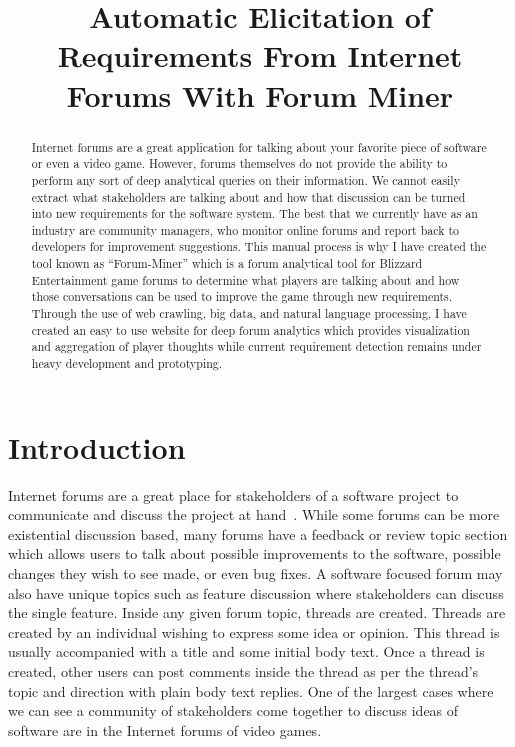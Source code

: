 \documentclass[conference]{IEEEtran}
\begin{document}
\title{Automatic Elicitation of Requirements From Internet Forums With Forum Miner}

\author{
}

\maketitle


\begin{abstract}
Internet forums are a great application for talking about your favorite piece of software
or even a video game. However, forums themselves do not provide the ability to perform any sort
of deep analytical queries on their information. We cannot easily extract what stakeholders
are talking about and how that discussion can be turned into new requirements for the software
system. The best that we currently have as an industry
are community managers, who monitor online forums and report back to developers for improvement
suggestions. This manual process is why I have created the tool known as ``Forum-Miner'' which
is a forum analytical tool for Blizzard Entertainment game forums to determine what players are talking about
and how those conversations can be used to improve the game through new requirements. Through the use of web crawling,
big data, and natural language processing, I have created an easy to use website for deep forum analytics 
which provides visualization and aggregation of player thoughts while current requirement detection
remains under heavy development and prototyping.
\end{abstract}


\section{Introduction}
Internet forums are a great place for stakeholders of a software project to communicate and discuss the
project at hand~\cite{Elsas:2010:STF}. While some forums can be more existential discussion based, many forums have a feedback
or review topic section which allows users to talk about possible improvements to the software, possible
changes they wish to see made, or even bug fixes. A software focused forum may also have unique topics
such as feature discussion where stakeholders can discuss the single feature.
Inside any given forum topic, threads are created. Threads are created by an individual wishing to express
some idea or opinion. This thread is usually accompanied with a title and some initial body text. Once
a thread is created, other users can post comments inside the thread as per the thread's topic and direction
with plain body text replies. One of the largest cases where we can see 
a community of stakeholders come together to discuss ideas of software are in the Internet forums of video games.
\end{document}
